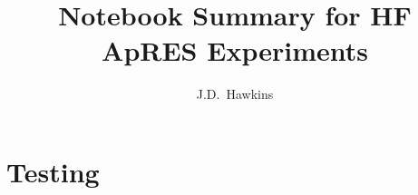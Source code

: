 \documentclass[a4paper]{article}
\title{\textbf{Notebook Summary for HF ApRES Experiments}}
\author{J.D.~Hawkins}
\begin{document}
    \maketitle
    
    \newpage

    \section{Testing}
    
\end{document}

